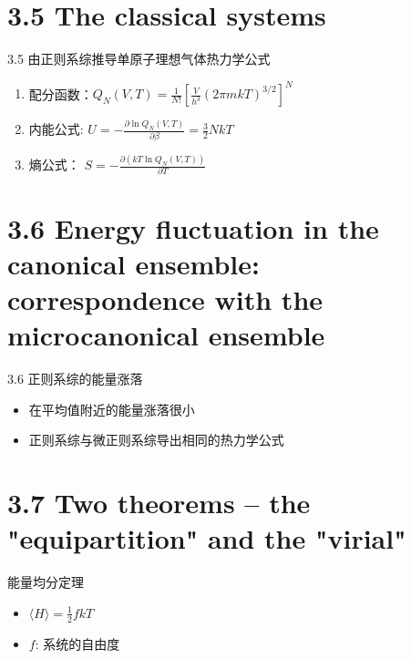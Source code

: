 \documentclass{ctexbeamer}
\begin{document}
\section{3.5 The classical systems}
\begin{frame}{3.5 由正则系综推导单原子理想气体热力学公式}
    \begin{enumerate}
        \item 配分函数：$Q_N(V,T) = \frac{1}{N!} \left[ \frac{V}{h^3}(2\pi mkT)^{3/2} \right]^N$
        \item 内能公式: $U=-\frac{\partial \ln Q_N(V,T)}{\partial \beta}=\frac{3}{2}NkT$
        \item 熵公式： $S=-\frac{ \partial (kT \ln Q_N(V,T))}
        { \partial T}$
    \end{enumerate}
\end{frame}
\section{3.6 Energy fluctuation in the canonical ensemble: correspondence with the microcanonical ensemble}
\begin{frame}{3.6 正则系综的能量涨落}
    \begin{itemize}
        \item 在平均值附近的能量涨落很小
        \item 正则系综与微正则系综导出相同的热力学公式
    \end{itemize}
\end{frame}
\section{3.7 Two theorems -- the "equipartition" and the "virial"}
\begin{frame}{能量均分定理}
\begin{itemize}
    \item $\langle H \rangle = \frac{1}{2} fkT$
    \item $f$: 系统的自由度
\end{itemize}
\end{frame}
\end{document}
